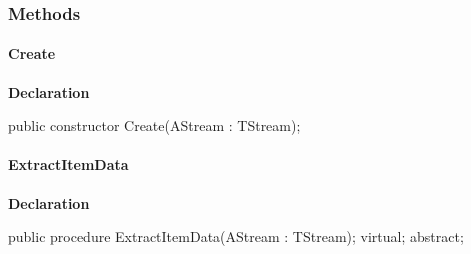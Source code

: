 \documentclass{report}
\newif\ifpdf
\begin{document}
\subsubsection*{\large{\textbf{Methods}}\normalsize\hspace{1ex}\hfill}
\paragraph*{Create}\hspace*{\fill}

\label{AbArcTyp.TAbArchiveStreamHelper-Create}
\begin{list}{}{
\setlength{\itemindent}{0cm}
\setlength{\listparindent}{0cm}
\setlength{\leftmargin}{\evensidemargin}
\addtolength{\leftmargin}{\tmplength}
\settowidth{\labelsep}{X}
\addtolength{\leftmargin}{\labelsep}
\setlength{\labelwidth}{\tmplength}
}
\item[\textbf{Declaration}\hfill]
\ifpdf
\begin{flushleft}
\fi
\begin{ttfamily}
public constructor Create(AStream : TStream);\end{ttfamily}

\ifpdf
\end{flushleft}
\fi

\end{list}
\paragraph*{ExtractItemData}\hspace*{\fill}

\label{AbArcTyp.TAbArchiveStreamHelper-ExtractItemData}
\begin{list}{}{
\setlength{\itemindent}{0cm}
\setlength{\listparindent}{0cm}
\setlength{\leftmargin}{\evensidemargin}
\addtolength{\leftmargin}{\tmplength}
\settowidth{\labelsep}{X}
\addtolength{\leftmargin}{\labelsep}
\setlength{\labelwidth}{\tmplength}
}
\item[\textbf{Declaration}\hfill]
\ifpdf
\begin{flushleft}
\fi
\begin{ttfamily}
public procedure ExtractItemData(AStream : TStream); virtual; abstract;\end{ttfamily}

\ifpdf
\end{flushleft}
\fi

\end{list}
\end{document}
